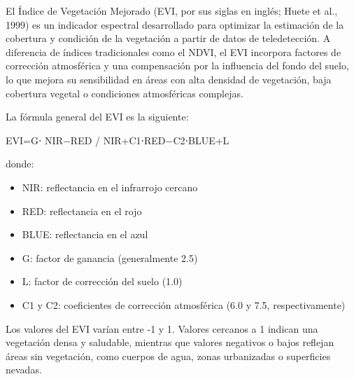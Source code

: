 \documentclass[
]{book}
\providecommand{\tightlist}{%
  \setlength{\itemsep}{0pt}\setlength{\parskip}{0pt}}
\begin{document}
El Índice de Vegetación Mejorado (EVI, por sus siglas en inglés; Huete et al., 1999) es un indicador espectral desarrollado para optimizar la estimación de la cobertura y condición de la vegetación a partir de datos de teledetección. A diferencia de índices tradicionales como el NDVI, el EVI incorpora factores de corrección atmosférica y una compensación por la influencia del fondo del suelo, lo que mejora su sensibilidad en áreas con alta densidad de vegetación, baja cobertura vegetal o condiciones atmosféricas complejas.

La fórmula general del EVI es la siguiente:

EVI=G⋅ NIR−RED / NIR+C1\hspace{0pt}⋅RED−C2\hspace{0pt}⋅BLUE+L

donde:

\begin{itemize}
\tightlist
\item
  NIR: reflectancia en el infrarrojo cercano\\
\item
  RED: reflectancia en el rojo\\
\item
  BLUE: reflectancia en el azul\\
\item
  G: factor de ganancia (generalmente 2.5)\\
\item
  L: factor de corrección del suelo (1.0)\\
\item
  C1 y C2\hspace{0pt}: coeficientes de corrección atmosférica (6.0 y 7.5, respectivamente)
\end{itemize}

Los valores del EVI varían entre -1 y 1. Valores cercanos a 1 indican una vegetación densa y saludable, mientras que valores negativos o bajos reflejan áreas sin vegetación, como cuerpos de agua, zonas urbanizadas o superficies nevadas.
\end{document}
